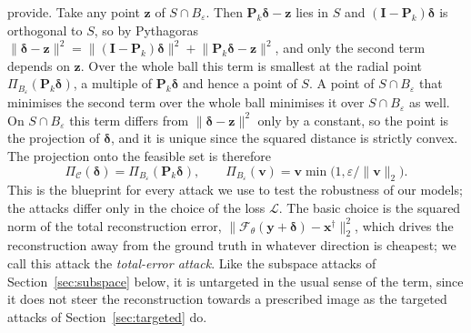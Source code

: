 \documentclass{article}
\numberwithin{equation}{section}
\begin{document}
provide. Take any point $\mathbf{z}$ of $S\cap B_\varepsilon$. Then
$\mathbf{P}_k\boldsymbol{\delta}-\mathbf{z}$ lies in $S$ and $(\mathbf{I}-\mathbf{P}_k)\boldsymbol{\delta}$ is
orthogonal to $S$, so by Pythagoras
$\lVert\boldsymbol{\delta}-\mathbf{z}\rVert^2=\lVert(\mathbf{I}-\mathbf{P}_k)\boldsymbol{\delta}\rVert^2+\lVert\mathbf{P}_k\boldsymbol{\delta}-\mathbf{z}\rVert^2$,
and only the second term depends on $\mathbf{z}$. Over the whole ball this term is smallest at the radial
point $\Pi_{B_\varepsilon}(\mathbf{P}_k\boldsymbol{\delta})$, a multiple of $\mathbf{P}_k\boldsymbol{\delta}$ and
hence a point of $S$. 
A point of $S\cap B_\varepsilon$ that minimises the second term over the whole ball minimises it over $S\cap B_\varepsilon$ as well.
On $S\cap B_\varepsilon$ this term differs from $\lVert\boldsymbol{\delta}-\mathbf{z}\rVert^2$ only by a constant, so the point is the projection of $\boldsymbol{\delta}$, and it is unique since the squared distance is strictly convex.
The projection onto the feasible set is therefore
\begin{equation}\label{eq:proj}
\Pi_{\mathcal{C}}(\boldsymbol{\delta})=\Pi_{B_\varepsilon}(\mathbf{P}_k\boldsymbol{\delta}),
\qquad \Pi_{B_\varepsilon}(\mathbf{v})=\mathbf{v}\min\bigl(1,\varepsilon/\lVert\mathbf{v}\rVert_2\bigr).
\end{equation}
This is the blueprint for every attack we use to test the robustness of our models;
the attacks differ only in the choice of the loss $\mathcal{L}$. The basic choice is the squared norm of
the total reconstruction error,
$\lVert\mathcal{F}_\theta(\mathbf{y}+\boldsymbol{\delta})-\mathbf{x}^\dagger\rVert_2^2$, which drives the
reconstruction away from the ground truth in whatever direction is cheapest; we call this attack the
\emph{total-error attack}. Like the subspace attacks of Section~\ref{sec:subspace} below, it is untargeted in
the usual sense of the term, since it does not steer the reconstruction towards a prescribed image as the
targeted attacks of Section~\ref{sec:targeted} do.\\
\end{document}
